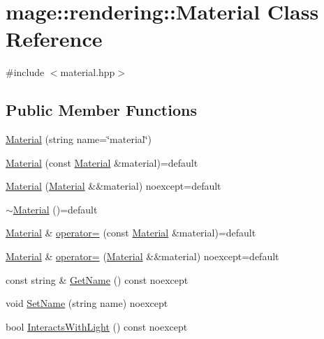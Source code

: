 \hypertarget{classmage_1_1rendering_1_1_material}{}\section{mage\+:\+:rendering\+:\+:Material Class Reference}
\label{classmage_1_1rendering_1_1_material}


{\ttfamily \#include $<$material.\+hpp$>$}

\subsection*{Public Member Functions}
\begin{DoxyCompactItemize}
\item 
\hyperlink{classmage_1_1rendering_1_1_material_a0d23055b62f54a28c77010412099a446}{Material} (string name=\char`\"{}material\char`\"{})
\item 
\hyperlink{classmage_1_1rendering_1_1_material_ac7cffca59fe250f10c2e68a875a03e91}{Material} (const \hyperlink{classmage_1_1rendering_1_1_material}{Material} \&material)=default
\item 
\hyperlink{classmage_1_1rendering_1_1_material_a52f4b3b0849b96306ea79c746070c6ba}{Material} (\hyperlink{classmage_1_1rendering_1_1_material}{Material} \&\&material) noexcept=default
\item 
\hyperlink{classmage_1_1rendering_1_1_material_a0dcdba799e013b2a8ff0108b14b9a73c}{$\sim$\+Material} ()=default
\item 
\hyperlink{classmage_1_1rendering_1_1_material}{Material} \& \hyperlink{classmage_1_1rendering_1_1_material_a535022bb3c1264412278337fc3d5d717}{operator=} (const \hyperlink{classmage_1_1rendering_1_1_material}{Material} \&material)=default
\item 
\hyperlink{classmage_1_1rendering_1_1_material}{Material} \& \hyperlink{classmage_1_1rendering_1_1_material_a2f90e0eeb8283da70db48fc1618aed10}{operator=} (\hyperlink{classmage_1_1rendering_1_1_material}{Material} \&\&material) noexcept=default
\item 
const string \& \hyperlink{classmage_1_1rendering_1_1_material_ab94089dbe7d1b242fad455e9c233a78c}{Get\+Name} () const noexcept
\item 
void \hyperlink{classmage_1_1rendering_1_1_material_a5700b990bfd59c497e07ee6682ffbf06}{Set\+Name} (string name) noexcept
\item 
bool \hyperlink{classmage_1_1rendering_1_1_material_ac9ee80a246dd28e19a6e29065b8eb24d}{Interacts\+With\+Light} () const noexcept

\end{DoxyCompactItemize}
